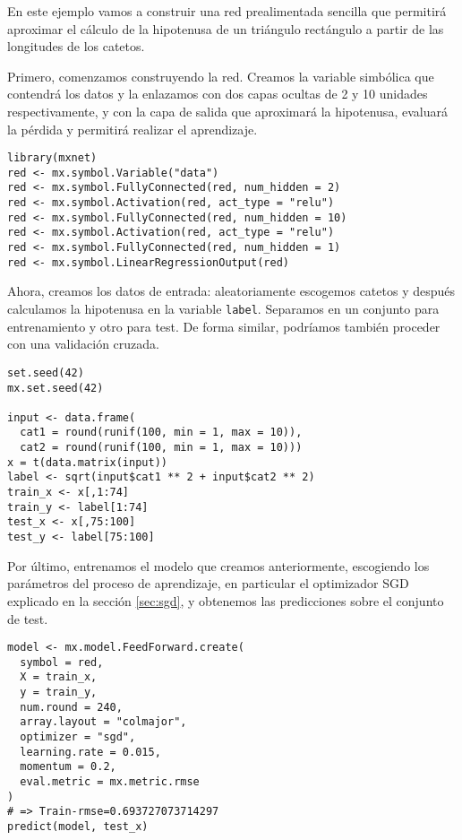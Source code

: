 \begin{example}

  En este ejemplo vamos a construir una red prealimentada sencilla que permitirá aproximar el cálculo de la hipotenusa de un triángulo rectángulo a partir de las longitudes de los catetos.

  Primero, comenzamos construyendo la red. Creamos la variable simbólica que contendrá los datos y la enlazamos con dos capas ocultas de 2 y 10 unidades respectivamente, y con la capa de salida que aproximará la hipotenusa, evaluará la pérdida y permitirá realizar el aprendizaje.
  
  \begin{verbatim}
library(mxnet)
red <- mx.symbol.Variable("data")
red <- mx.symbol.FullyConnected(red, num_hidden = 2)
red <- mx.symbol.Activation(red, act_type = "relu")
red <- mx.symbol.FullyConnected(red, num_hidden = 10)
red <- mx.symbol.Activation(red, act_type = "relu")
red <- mx.symbol.FullyConnected(red, num_hidden = 1)
red <- mx.symbol.LinearRegressionOutput(red)
\end{verbatim}
  
  Ahora, creamos los datos de entrada: aleatoriamente escogemos catetos y después calculamos la hipotenusa en la variable \texttt{label}. Separamos en un conjunto para entrenamiento y otro para test. De forma similar, podríamos también proceder con una validación cruzada.
  
\begin{verbatim}
set.seed(42)
mx.set.seed(42)

input <- data.frame(
  cat1 = round(runif(100, min = 1, max = 10)),
  cat2 = round(runif(100, min = 1, max = 10)))
x = t(data.matrix(input))
label <- sqrt(input$cat1 ** 2 + input$cat2 ** 2)
train_x <- x[,1:74]
train_y <- label[1:74]
test_x <- x[,75:100]
test_y <- label[75:100]
\end{verbatim}

Por último, entrenamos el modelo que creamos anteriormente, escogiendo los parámetros del proceso de aprendizaje, en particular el optimizador SGD explicado en la sección \ref{sec:sgd}, y obtenemos las predicciones sobre el conjunto de test.
  
\begin{verbatim}
model <- mx.model.FeedForward.create(
  symbol = red,
  X = train_x,
  y = train_y,
  num.round = 240,
  array.layout = "colmajor",
  optimizer = "sgd",
  learning.rate = 0.015,
  momentum = 0.2,
  eval.metric = mx.metric.rmse
)
# => Train-rmse=0.693727073714297
predict(model, test_x)
\end{verbatim} 
  
\end{example}


